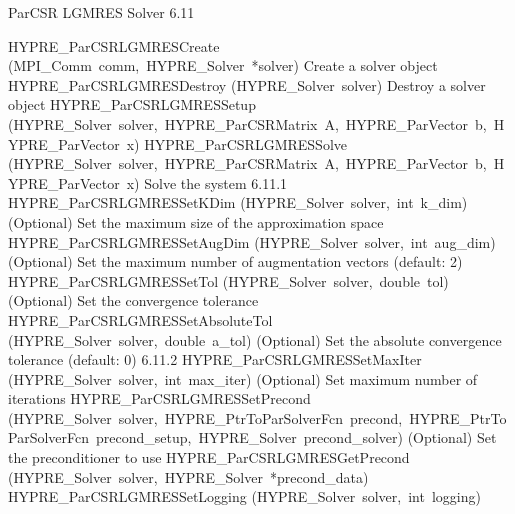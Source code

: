 \documentclass{article}
\begin{document}
\begin{cxxentry}
\begin{cxxentry}
\begin{cxxfunction}
\begin{cxxdoc}
\end{cxxdoc}
\end{cxxfunction}
\end{cxxentry}
\begin{cxxentry}
{}
        {ParCSR LGMRES Solver}
        {}
        {
}
        {6.11}
\begin{cxxnames}
        {HYPRE\_ParCSRLGMRESCreate}
        {(MPI\_Comm\ comm,\ HYPRE\_Solver\ *solver)}
        {
Create a solver object}
        {}
\label{cxx.6.11.3}
        {HYPRE\_ParCSRLGMRESDestroy}
        {(HYPRE\_Solver\ solver)}
        {
Destroy a solver object}
        {}
\label{cxx.6.11.4}
        {HYPRE\_ParCSRLGMRESSetup}
        {(HYPRE\_Solver\ solver,\ HYPRE\_ParCSRMatrix\ A,\ HYPRE\_ParVector\ b,\ HYPRE\_ParVector\ x)}
        {}
        {}
\label{cxx.6.11.5}
        {HYPRE\_ParCSRLGMRESSolve}
        {(HYPRE\_Solver\ solver,\ HYPRE\_ParCSRMatrix\ A,\ HYPRE\_ParVector\ b,\ HYPRE\_ParVector\ x)}
        {
Solve the system}
        {6.11.1}
        {HYPRE\_ParCSRLGMRESSetKDim}
        {(HYPRE\_Solver\ solver,\ int\ k\_dim)}
        {
(Optional) Set the maximum size of the approximation space}
        {}
\label{cxx.6.11.6}
        {HYPRE\_ParCSRLGMRESSetAugDim}
        {(HYPRE\_Solver\ solver,\ int\ aug\_dim)}
        {
(Optional) Set the maximum number of augmentation vectors (default: 2)}
        {}
\label{cxx.6.11.7}
        {HYPRE\_ParCSRLGMRESSetTol}
        {(HYPRE\_Solver\ solver,\ double\ tol)}
        {
(Optional) Set the convergence tolerance}
        {}
\label{cxx.6.11.8}
        {HYPRE\_ParCSRLGMRESSetAbsoluteTol}
        {(HYPRE\_Solver\ solver,\ double\ a\_tol)}
        {
(Optional) Set the absolute convergence tolerance (default: 0)}
        {6.11.2}
        {HYPRE\_ParCSRLGMRESSetMaxIter}
        {(HYPRE\_Solver\ solver,\ int\ max\_iter)}
        {
(Optional) Set maximum number of iterations}
        {}
\label{cxx.6.11.9}
        {HYPRE\_ParCSRLGMRESSetPrecond}
        {(HYPRE\_Solver\ solver,\ HYPRE\_PtrToParSolverFcn\ precond,\ HYPRE\_PtrToParSolverFcn\ precond\_setup,\ HYPRE\_Solver\ precond\_solver)}
        {
(Optional) Set the preconditioner to use}
        {}
\label{cxx.6.11.10}
        {HYPRE\_ParCSRLGMRESGetPrecond}
        {(HYPRE\_Solver\ solver,\ HYPRE\_Solver\ *precond\_data)}
        {}
        {}
\label{cxx.6.11.11}
        {HYPRE\_ParCSRLGMRESSetLogging}
        {(HYPRE\_Solver\ solver,\ int\ logging)}

\end{cxxnames}
\end{cxxentry}
\end{cxxentry}
\end{document}

